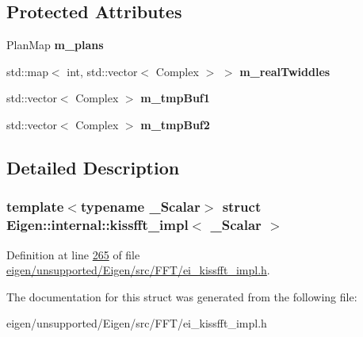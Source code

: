 \subsection*{Protected Attributes}
\begin{DoxyCompactItemize}
\item 
\mbox{\label{struct_eigen_1_1internal_1_1kissfft__impl_a0d73230bed57a7b3c1cfe7ff4708c1be}} 
Plan\+Map {\bfseries m\+\_\+plans}
\item 
\mbox{\label{struct_eigen_1_1internal_1_1kissfft__impl_a3e6a1b869a23f9af159026c6042e22ff}} 
std\+::map$<$ int, std\+::vector$<$ Complex $>$ $>$ {\bfseries m\+\_\+real\+Twiddles}
\item 
\mbox{\label{struct_eigen_1_1internal_1_1kissfft__impl_a7f48c7ae4a0919772e9ed52826d22c31}} 
std\+::vector$<$ Complex $>$ {\bfseries m\+\_\+tmp\+Buf1}
\item 
\mbox{\label{struct_eigen_1_1internal_1_1kissfft__impl_a15f9e01562a1ad97dc35d5e1438d45a3}} 
std\+::vector$<$ Complex $>$ {\bfseries m\+\_\+tmp\+Buf2}
\end{DoxyCompactItemize}


\subsection{Detailed Description}
\subsubsection*{template$<$typename \+\_\+\+Scalar$>$\newline
struct Eigen\+::internal\+::kissfft\+\_\+impl$<$ \+\_\+\+Scalar $>$}



Definition at line \hyperlink{eigen_2unsupported_2_eigen_2src_2_f_f_t_2ei__kissfft__impl_8h_source_l00265}{265} of file \hyperlink{eigen_2unsupported_2_eigen_2src_2_f_f_t_2ei__kissfft__impl_8h_source}{eigen/unsupported/\+Eigen/src/\+F\+F\+T/ei\+\_\+kissfft\+\_\+impl.\+h}.



The documentation for this struct was generated from the following file\+:\begin{DoxyCompactItemize}
\item 
eigen/unsupported/\+Eigen/src/\+F\+F\+T/ei\+\_\+kissfft\+\_\+impl.\+h\end{DoxyCompactItemize}
